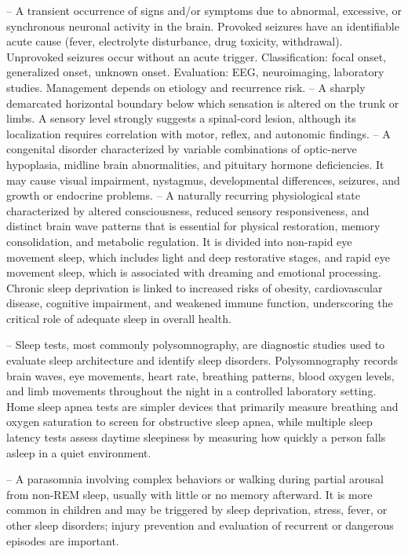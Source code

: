 -- A transient occurrence of signs and/or symptoms due to abnormal, excessive, or synchronous neuronal activity in the brain. Provoked seizures have an identifiable acute cause (fever, electrolyte disturbance, drug toxicity, withdrawal). Unprovoked seizures occur without an acute trigger. Classification: focal onset, generalized onset, unknown onset. Evaluation: EEG, neuroimaging, laboratory studies. Management depends on etiology and recurrence risk.
-- A sharply demarcated horizontal boundary below which sensation is altered on the trunk or limbs. A sensory level strongly suggests a spinal-cord lesion, although its localization requires correlation with motor, reflex, and autonomic findings.
-- A congenital disorder characterized by variable combinations of optic-nerve hypoplasia, midline brain abnormalities, and pituitary hormone deficiencies. It may cause visual impairment, nystagmus, developmental differences, seizures, and growth or endocrine problems.
-- A naturally recurring physiological state characterized by altered consciousness, reduced sensory responsiveness, and distinct brain wave patterns that is essential for physical restoration, memory consolidation, and metabolic regulation. It is divided into non-rapid eye movement sleep, which includes light and deep restorative stages, and rapid eye movement sleep, which is associated with dreaming and emotional processing. Chronic sleep deprivation is linked to increased risks of obesity, cardiovascular disease, cognitive impairment, and weakened immune function, underscoring the critical role of adequate sleep in overall health.

-- Sleep tests, most commonly polysomnography, are diagnostic studies used to evaluate sleep architecture and identify sleep disorders. Polysomnography records brain waves, eye movements, heart rate, breathing patterns, blood oxygen levels, and limb movements throughout the night in a controlled laboratory setting. Home sleep apnea tests are simpler devices that primarily measure breathing and oxygen saturation to screen for obstructive sleep apnea, while multiple sleep latency tests assess daytime sleepiness by measuring how quickly a person falls asleep in a quiet environment.

-- A parasomnia involving complex behaviors or walking during partial arousal from non-REM sleep, usually with little or no memory afterward. It is more common in children and may be triggered by sleep deprivation, stress, fever, or other sleep disorders; injury prevention and evaluation of recurrent or dangerous episodes are important.

